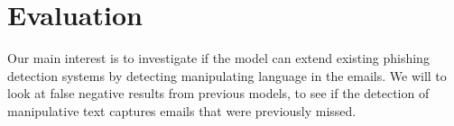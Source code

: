 \documentclass[
	letterpaper, %
	12pt, %
	unnumberedsections, %
	twoside, %
]{LTJournalArticle}
\begin{document}
\section{Evaluation}
Our main interest is to investigate if the model can extend existing phishing detection systems by detecting manipulating language in the emails. We will to look at false negative results from previous models, to see if the detection of manipulative text captures emails that were previously missed.








\clearpage
\printbibliography %



%
%
%
\end{document}
